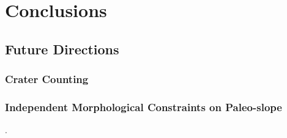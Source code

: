 \chapter{Conclusions}

\section{Future Directions}
\subsection{Crater Counting}
\textcite{kneissl_map-projection-independent_2011,robbins_volcanic_2011,
robbins_large_2013,
platz_crater-based_2013}

\subsection{Independent Morphological Constraints on Paleo-slope}
\textcite{wadge_lobes_1991, peitersen_correlations_2000,peters_lava_2021}.